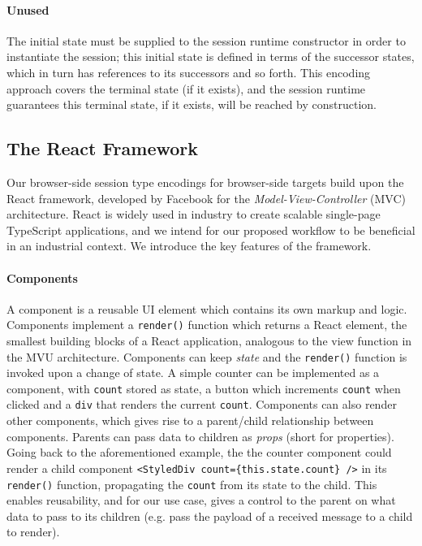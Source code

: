 \paragraph{Unused}
The initial state must be supplied to the session runtime
constructor in order to instantiate the session;
this initial state is defined
in terms of the successor states, which in turn has references to its
successors and so forth.
This encoding approach covers the terminal state (if it exists), and the
session runtime guarantees this terminal state, if it exists, will be reached
by construction.

\subsection{The React Framework}
Our browser-side session type encodings for browser-side targets build upon the React framework, developed by Facebook \cite{React} for the \textit{Model-View-Controller} (MVC) architecture. React is widely used in industry to create scalable single-page TypeScript
applications, and we intend for our proposed workflow to be beneficial in an
industrial context.
We introduce the key features of the framework.

\paragraph{Components}
A component is a reusable UI element which
contains its own markup and logic.
Components implement a \texttt{render()} function which returns a React
element, the smallest building blocks of a React application, analogous to the
view function in the MVU architecture.
Components can keep \textit{state} and the \texttt{render()} function is
invoked upon a change of state.
A simple counter can be implemented as a component,
with \texttt{count} stored as state, a button which increments \texttt{count}
when clicked and a \texttt{div} that renders the current
\texttt{count}.
Components can also render other components, which gives rise
to a parent/child relationship between components.
Parents can pass data to children as \textit{props} (short for properties).
Going back to the aforementioned example, the the counter component could
render a child component \texttt{<StyledDiv count=\{this.state.count\} />} in
its \texttt{render()} function, propagating the \texttt{count} from its state
to the child.
This enables reusability, and for our use case, gives a control to the parent
on what data to pass to its children (e.g. pass the payload of a received
message to a child to render).


